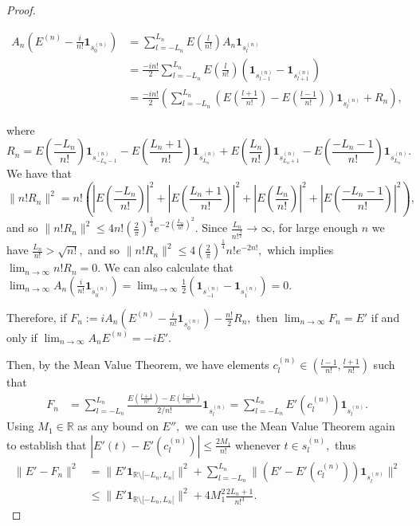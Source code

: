 \documentclass{amsart}
\theoremstyle{definition}
\theoremstyle{remark}
\begin{document}
\begin{proof}
	\begin{samepage}
	\begin{align*}
		A_n\left(E^{(n)}-\frac{i}{n!}\mathbf{1}_{s_0^{(n)}}\right)&=\sum_{l=-L_n}^{L_n}E\left(\frac{l}{n!}\right)A_n\mathbf{1}_{s_l^{(n)}}\\
		&=\frac{-in!}{2}\sum_{l=-L_n}^{L_n}E\left(\frac{l}{n!}\right)\left(\mathbf{1}_{s_{l-1}^{(n)}}-\mathbf{1}_{s_{l+1}^{(n)}}\right) \\
		&=\frac{-in!}{2}\left(\sum_{l=-L_n}^{L_n}\left(E\left(\frac{l+1}{n!}\right)-E\left(\frac{l-1}{n!}\right)\right)\mathbf{1}_{s_l^{(n)}}+R_n\right),
	\end{align*}
	\end{samepage}
	where $$R_n=E(\frac{-L_n}{n!})\mathbf{1}_{s_{-L_n-1}^{(n)}}-E(\frac{L_n+1}{n!})\mathbf{1}_{s_{L_n}^{(n)}}+E(\frac{L_n}{n!})\mathbf{1}_{s_{L_n+1}^{(n)}}-E(\frac{-L_n-1}{n!})\mathbf{1}_{s_{L_n}^{(n)}}.$$ We have that $$\|n!R_n\|^2=n!\left(|E(\frac{-L_n}{n!})|^2+|E(\frac{L_n+1}{n!})|^2+|E(\frac{L_n}{n!})|^2+|E(\frac{-L_n-1}{n!})|^2\right),$$ and so $\|n!R_n\|^2\leq 4n!\left(\frac{2}{\pi}\right)^{\frac{1}{4}}e^{-2(\frac{L_n}{n!})^2}$. Since $\frac{L_n}{n!^{\frac{3}{2}}}\rightarrow\infty$, for large enough $n$ we have $\frac{L_n}{n!}>\sqrt{n!},$ and so $\|n!R_n\|^2\leq 4\left(\frac{2}{\pi}\right)^{\frac{1}{4}}n!e^{-2 n!},$ which implies $\lim_{n\rightarrow\infty} n!R_n=0.$ We can also calculate that $\lim_{n\rightarrow\infty}A_n(\frac{i}{n!}\mathbf{1}_{s_0^{(n)}})=\lim_{n\rightarrow\infty}\frac{1}{2}(\mathbf{1}_{s_{-1}^{(n)}}-\mathbf{1}_{s_1^{(n)}})=0.$ 
	
	Therefore, if $F_n:=iA_n\left(E^{(n)}-\frac{i}{n!}\mathbf{1}_{s_0^{(n)}}\right)-\frac{n!}{2}R_n,$ then $\lim_{n\rightarrow\infty} F_n= E'$ if and only if $\lim_{n\rightarrow\infty}A_nE^{(n)}=-iE'.$
	
	Then, by the Mean Value Theorem, we have elements  $c_l^{(n)}\in(\frac{l-1}{n!},\frac{l+1}{n!})$ such that
	\begin{align*}
		F_n&=\sum_{l=-L_n}^{L_n}\frac{E\left(\frac{l+1}{n!}\right)-E\left(\frac{l-1}{n!}\right)}{2/n!}\mathbf{1}_{s_l^{(n)}}=\sum_{l=-L_n}^{L_n} E'(c_l^{(n)})\mathbf{1}_{s_l^{(n)}}.
	\end{align*}
	Using $M_1\in\mathbb{R}$ as any bound on $E'',$ we can use the Mean Value Theorem again to establish that $|E'(t)-E'(c_l^{(n)})|\leq\frac{2M_1}{n!}$ whenever $t\in s_l^{(n)},$ thus
	\begin{align*}
		\|E'-F_n\|^2&=\|E'\mathbf{1}_{\mathbb{R}\setminus[-L_n,L_n[}\|^2+\sum_{l=-L_n}^{L_n}\|(E'-E'(c_l^{(n)}))\mathbf{1}_{s_l^{(n)}}\|^2\\
		&\leq \|E'\mathbf{1}_{\mathbb{R}\setminus[-L_n,L_n[}\|^2+4M_1^2\frac{2L_n+1}{n!^3}.
	\end{align*}
	

\end{proof}
\end{document}
